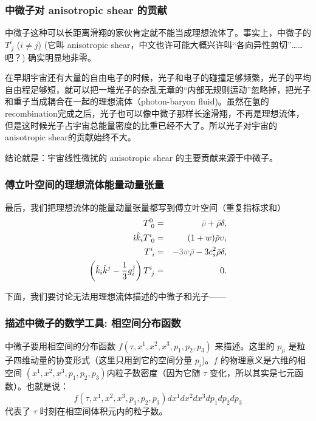 \documentclass[CJK,13pt]{beamer}
\begin{document}
  \begin{frame}
    \frametitle{中微子对 anisotropic shear 的贡献}
    中微子这种可以长距离滑翔的家伙肯定就不能当成理想流体了。事实上，中微子的 $T^i_{\ j}$ ($i\ne j$) (它叫 {\blue anisotropic shear}，中文也许可能大概兴许叫“各向异性剪切”……吧？) 确实明显地非零。

    \skipline

    
    在早期宇宙还有大量的自由电子的时候，光子和电子的碰撞足够频繁，光子的平均自由程足够短，就可以把一堆光子的杂乱无章的“内部无规则运动”忽略掉，把光子和重子当成耦合在一起的理想流体（photon-baryon fluid)。虽然在氢的recombination完成之后，光子也可以像中微子那样长途滑翔，不再是理想流体，但是这时候光子占宇宙总能量密度的比重已经不大了。所以光子对宇宙的 anisotropic shear的贡献始终不大。

      \skipline

      结论就是：{\blue 宇宙线性微扰的 anisotropic shear 的主要贡献来源于中微子。}
  \end{frame}


\begin{frame}
  \frametitle{傅立叶空间的理想流体能量动量张量}
  最后，我们把理想流体的能量动量张量都写到傅立叶空间（重复指标求和）
   {\blue \begin{eqnarray}
      T^0_{\ 0} &=& {\gray \bar{\rho}} + \bar{\rho}\delta, \label{eq:1}\\
      \ii \hat{k}_i T^i_{\ 0} &=&  (1+w)\bar{\rho}\upsilon,  \\
      T^i_{\ i} &=&  {\gray -3w\bar{\rho}} - 3c_s^2\bar{\rho}\delta, \\
      \left(\hat{k}_i\hat{k}^j - \frac{1}{3}g_i^j\right)T^i_{\ j} &=& 0. \label{eq:4}
    \end{eqnarray}
   }
    \skipline

    下面，我们要讨论无法用理想流体描述的中微子和光子——
\end{frame}


  \begin{frame}
    \frametitle{描述中微子的数学工具: 相空间分布函数}
    中微子要用相空间的分布函数 $f(\tau, x^1, x^2, x^3, p_1, p_2, p_3)$ 来描述。这里的 $p_\mu$ 是粒子四维动量的协变形式（这里只用到它的空间分量 $p_i$)。$f$ 的物理意义是六维的相空间 $(x^1,x^2,x^3, p_1, p_2, p_3)$内粒子数密度（因为它随 $\tau$ 变化，所以其实是七元函数）。也就是说：
      $$ f(\tau, x^1, x^2, x^3, p_1, p_2, p_3) dx^1dx^2dx^3dp_1dp_2dp_3$$
      代表了 $\tau$ 时刻在相空间体积元内的粒子数。

  \end{frame}
\end{document}

